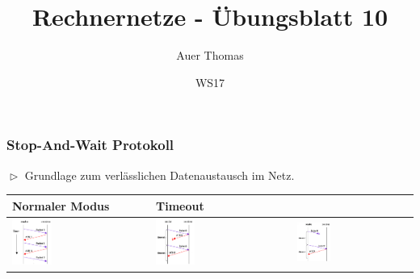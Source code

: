 \documentclass{beamer}
\title{Rechnernetze - Übungsblatt 10}
\author{Auer Thomas}
\date{WS17}
\begin{document}
    \frame{\maketitle}

    \begin{frame}
        \frametitle{Stop-And-Wait Protokoll}
        $\vartriangleright$ Grundlage zum verlässlichen Datenaustausch im Netz.\\
        \begin{table}
            \begin{tabular}{l|ll}
                Normaler Modus                                                  & Timeout                                                       & \\\hline\hline
                \includegraphics[width=0.3\textwidth]{graphics/Operating.png}   & \includegraphics[width=0.3\textwidth]{graphics/Timeout1.png}  & \includegraphics[width=0.3\textwidth]{graphics/Timeout2.png}  \\
            \end{tabular}
        \end{table}
    \end{frame}
\end{document}
